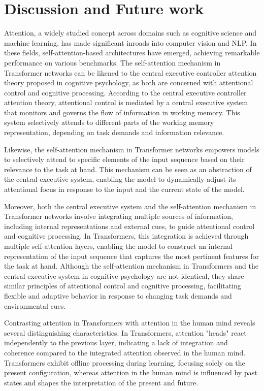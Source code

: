 \chapter{Discussion and Future work}

\startcontents[chapters]

Attention, a widely studied concept across domains such as cognitive science and machine learning, has made significant inroads into computer vision and NLP. In these fields, self-attention-based architectures have emerged, achieving remarkable performance on various benchmarks. The self-attention mechanism in Transformer networks can be likened to the central executive controller attention theory proposed in cognitive psychology, as both are concerned with attentional control and cognitive processing. According to the central executive controller attention theory, attentional control is mediated by a central executive system that monitors and governs the flow of information in working memory. This system selectively attends to different parts of the working memory representation, depending on task demands and information relevance.

Likewise, the self-attention mechanism in Transformer networks empowers models to selectively attend to specific elements of the input sequence based on their relevance to the task at hand. This mechanism can be seen as an abstraction of the central executive system, enabling the model to dynamically adjust its attentional focus in response to the input and the current state of the model.

Moreover, both the central executive system and the self-attention mechanism in Transformer networks involve integrating multiple sources of information, including internal representations and external cues, to guide attentional control and cognitive processing. In Transformers, this integration is achieved through multiple self-attention layers, enabling the model to construct an internal representation of the input sequence that captures the most pertinent features for the task at hand. Although the self-attention mechanism in Transformers and the central executive system in cognitive psychology are not identical, they share similar principles of attentional control and cognitive processing, facilitating flexible and adaptive behavior in response to changing task demands and environmental cues.

Contrasting attention in Transformers with attention in the human mind reveals several distinguishing characteristics. In Transformers, attention "heads" react independently to the previous layer, indicating a lack of integration and coherence compared to the integrated attention observed in the human mind. Transformers exhibit offline processing during learning, focusing solely on the present configuration, whereas attention in the human mind is influenced by past states and shapes the interpretation of the present and future.

